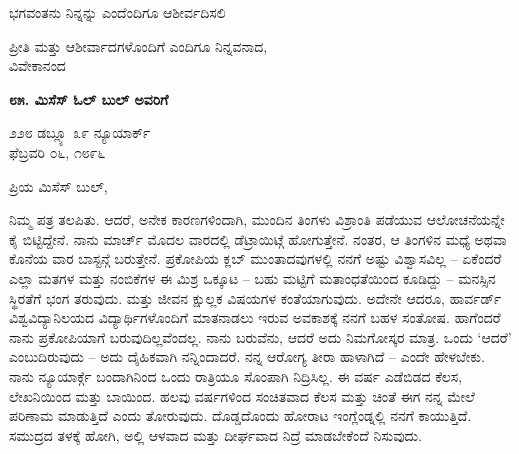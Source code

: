 ಭಗವಂತನು ನಿನ್ನನ್ನು ಎಂದೆಂದಿಗೂ ಆಶೀರ್ವದಿಸಲಿ

\begin{flushright}
ಪ್ರೀತಿ ಮತ್ತು ಆಶೀರ್ವಾದಗಳೊಂದಿಗೆ ಎಂದಿಗೂ ನಿನ್ನವನಾದ,\\ವಿವೇಕಾನಂದ
\end{flushright}

\begin{center}
\textbf{೮೫. ಮಿಸೆಸ್ ಓಲ್ ಬುಲ್ ಅವರಿಗೆ}
\end{center}

\begin{flushright}
೨೨೮ ಡಬ್ಲ್ಯೂ ೩೯ ನ್ಯೂಯಾರ್ಕ್\\ಫೆಬ್ರವರಿ ೦೬, ೧೮೯೬
\end{flushright}

ಪ್ರಿಯ ಮಿಸೆಸ್ ಬುಲ್,

ನಿಮ್ಮ ಪತ್ರ ತಲಪಿತು. ಆದರೆ, ಅನೇಕ ಕಾರಣಗಳಿಂದಾಗಿ, ಮುಂದಿನ ತಿಂಗಳು ವಿಶ್ರಾಂತಿ ಪಡೆಯುವ ಆಲೋಚನೆಯನ್ನೇ ಕೈ ಬಿಟ್ಟಿದ್ದೇನೆ. ನಾನು ಮಾರ್ಚ್ ಮೊದಲ ವಾರದಲ್ಲಿ ಡೆಟ್ರಾಯಿಟ್ಗೆ ಹೋಗುತ್ತೇನೆ. ನಂತರ, ಆ ತಿಂಗಳಿನ ಮಧ್ಯೆ ಅಥವಾ ಕೊನೆಯ ವಾರ ಬಾಸ್ಟನ್ಗೆ ಬರುತ್ತೇನೆ. ಪ್ರಕೋಪಿಯ ಕ್ಲಬ್ ಮುಂತಾದವುಗಳಲ್ಲಿ ನನಗೆ ಅಷ್ಟು ವಿಶ್ವಾಸವಿಲ್ಲ – ಏಕೆಂದರೆ ಎಲ್ಲಾ ಮತಗಳ ಮತ್ತು ನಂಬಿಕೆಗಳ ಈ ಮಿಶ್ರ ಒಕ್ಕೂಟ – ಬಹು ಮಟ್ಟಿಗೆ ಮತಾಂಧತೆಯಿಂದ ಕೂಡಿದ್ದು – ಮನಸ್ಸಿನ ಸ್ಥಿರತೆಗೆ ಭಂಗ ತರುವುದು. ಮತ್ತು ಜೀವನ ಕ್ಷುಲ್ಲಕ ವಿಷಯಗಳ ಕಂತೆಯಾಗುವುದು. ಅದೇನೇ ಆದರೂ, ಹಾರ್ವರ್ಡ್ ವಿಶ್ವವಿದ್ಯಾನಿಲಯದ ವಿದ್ಯಾರ್ಥಿಗಳೊಂದಿಗೆ ಮಾತನಾಡಲು ಇರುವ ಅವಕಾಶಕ್ಕೆ ನನಗೆ ಬಹಳ ಸಂತೋಷ. ಹಾಗೆಂದರೆ ನಾನು ಪ್ರಕೋಪಿಯಾಗೆ ಬರುವುದಿಲ್ಲವೆಂದಲ್ಲ. ನಾನು ಬರುವೆನು, ಆದರೆ ಅದು ನಿಮಗೋಸ್ಕರ ಮಾತ್ರ. ಒಂದು ‘ಆದರೆ’ ಎಂಬುದಿರುವುದು – ಅದು ದೈಹಿಕವಾಗಿ ನನ್ನಿಂದಾದರೆ. ನನ್ನ ಆರೋಗ್ಯ ತೀರಾ ಹಾಳಾಗಿದೆ – ಎಂದೇ ಹೇಳಬೇಕು. ನಾನು ನ್ಯೂಯಾರ್ಕ್ಗೆ ಬಂದಾಗಿನಿಂದ ಒಂದು ರಾತ್ರಿಯೂ ಸೊಂಪಾಗಿ ನಿದ್ರಿಸಿಲ್ಲ. ಈ ವರ್ಷ ಎಡೆಬಿಡದ ಕೆಲಸ, ಲೇಖನಿಯಿಂದ ಮತ್ತು ಬಾಯಿಂದ. ಹಲವು ವರ್ಷಗಳಿಂದ ಸಂಚಿತವಾದ ಕೆಲಸ ಮತ್ತು ಚಿಂತೆ ಈಗ ನನ್ನ ಮೇಲೆ ಪರಿಣಾಮ ಮಾಡುತ್ತಿದೆ ಎಂದು ತೋರುವುದು. ದೊಡ್ಡದೊಂದು ಹೋರಾಟ ಇಂಗ್ಲೆಂಡ್ನಲ್ಲಿ ನನಗೆ ಕಾಯುತ್ತಿದೆ. ಸಮುದ್ರದ ತಳಕ್ಕೆ ಹೋಗಿ, ಅಲ್ಲಿ ಆಳವಾದ ಮತ್ತು ದೀರ್ಘವಾದ ನಿದ್ರೆ ಮಾಡಬೇಕೆಂದೆ ನಿಸುವುದು.

